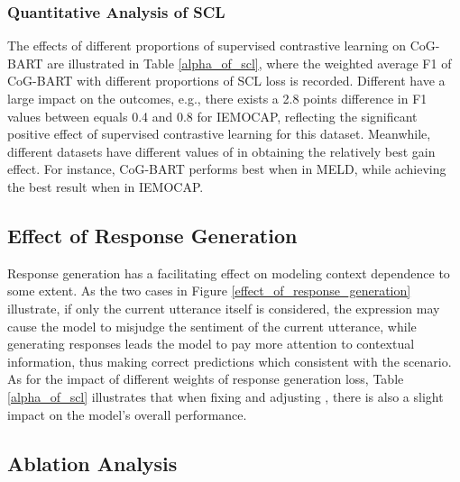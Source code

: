 \documentclass[letterpaper]{article} \usepackage{aaai22}  \usepackage{times}  \usepackage{helvet}  \usepackage{courier}  \usepackage[hyphens]{url}  \usepackage{graphicx} \urlstyle{rm} \def\UrlFont{\rm}  \usepackage{natbib}  \usepackage{caption} \DeclareCaptionStyle{ruled}{labelfont=normalfont,labelsep=colon,strut=off} \frenchspacing  \setlength{\pdfpagewidth}{8.5in}  \setlength{\pdfpageheight}{11in}  \usepackage{algorithm}
\begin{document}
\subsubsection{Quantitative Analysis of SCL}
The effects of different proportions of supervised contrastive learning on CoG-BART are illustrated in Table \ref{alpha_of_scl}, where the weighted average F1 of CoG-BART with different proportions of SCL loss is recorded. Different  have a large impact on the outcomes, e.g., there exists a 2.8 points difference in F1 values between  equals 0.4 and 0.8 for IEMOCAP, reflecting the significant positive effect of supervised contrastive learning for this dataset. Meanwhile, different datasets have different values of  in obtaining the relatively best gain effect. For instance, CoG-BART performs best when  in MELD, while achieving the best result when  in IEMOCAP.

\subsection{Effect of Response Generation}
Response generation has a facilitating effect on modeling context dependence to some extent. As the two cases in Figure \ref{effect_of_response_generation} illustrate, if only the current utterance itself is considered, the expression may cause the model to misjudge the sentiment of the current utterance, while generating responses leads the model to pay more attention to contextual information, thus making correct predictions which consistent with the scenario. As for the impact of different weights of response generation loss, Table \ref{alpha_of_scl} illustrates that when fixing  and adjusting , there is also a slight impact on the model's overall performance.


\subsection{Ablation Analysis}
\end{document}

